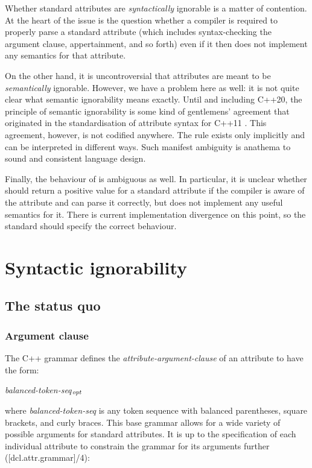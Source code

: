 Whether standard attributes are \emph{syntactically} ignorable is a matter of contention. At the heart of the issue is the question whether a compiler is required to properly parse a standard attribute (which includes syntax-checking the argument clause, appertainment, and so forth) even if it then does not implement any semantics for that attribute.

On the other hand, it is uncontroversial that attributes are meant to be \emph{semantically} ignorable. However, we have a problem here as well: it is not quite clear what semantic ignorability means exactly. Until and including C++20, the principle of semantic ignorability is some kind of gentlemens' agreement that originated in the standardisation of attribute syntax for C++11 \cite{N2761}. This agreement, however, is not codified anywhere. The rule exists only implicitly and can be interpreted in different ways. Such manifest ambiguity is anathema to sound and consistent language design.

Finally, the behaviour of  is ambiguous as well. In particular, it is unclear whether \mbox{} should return a positive value for a standard attribute if the compiler is aware of the attribute and can parse it correctly, but does not implement any useful semantics for it. There is current implementation divergence on this point, so the standard should specify the correct behaviour.


\section{Syntactic ignorability}
\subsection{The status quo}

\label{subsec:syntax}
\subsubsection{Argument clause}
\label{subsubsec:args}

The C++ grammar defines the \emph{attribute-argument-clause} of an attribute to have the form:
\begin{adjustwidth}{0.5cm}{0.5cm}
\tcode{( }\emph{balanced-token-seq}$_\emph{opt}$\tcode{ )}
\end{adjustwidth}
where \emph{balanced-token-seq} is any token sequence with balanced parentheses, square brackets, and curly braces. This base grammar allows for a wide variety of possible arguments for standard attributes. It is up to the specification of each individual attribute to constrain the grammar for its arguments further ([dcl.attr.grammar]/4):

